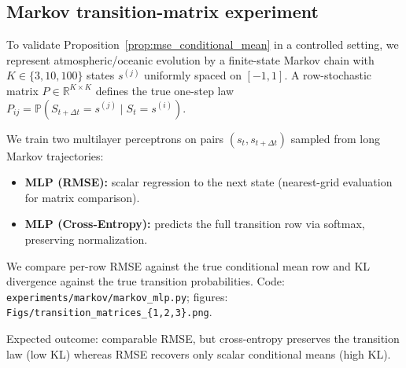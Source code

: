 
\subsection{Markov transition-matrix experiment}
\label{subsec:markov_methods}

To validate Proposition~\ref{prop:mse_conditional_mean} in a controlled setting, we represent atmospheric/oceanic evolution by a finite-state Markov chain with
$K\in\{3,10,100\}$ states $s^{(j)}$ uniformly spaced on $[-1,1]$.
A row-stochastic matrix $P\in\mathbb{R}^{K\times K}$ defines the true one-step law
$P_{ij}=\mathbb{P}(S_{t+\Delta t}=s^{(j)}\mid S_t=s^{(i)})$.

We train two multilayer perceptrons on pairs $(s_t,s_{t+\Delta t})$ sampled from long Markov trajectories:
\begin{itemize}
    \item \textbf{MLP (RMSE):} scalar regression to the next state (nearest-grid evaluation for matrix comparison).
    \item \textbf{MLP (Cross-Entropy):} predicts the full transition row via softmax, preserving normalization.
\end{itemize}
We compare per-row RMSE against the true conditional mean row and KL divergence against the true transition probabilities.
Code: \texttt{experiments/markov/markov\_mlp.py}; figures: \texttt{Figs/transition\_matrices\_\{1,2,3\}.png}.

Expected outcome: comparable RMSE, but cross-entropy preserves the transition law (low KL) whereas RMSE recovers only scalar conditional means (high KL).
